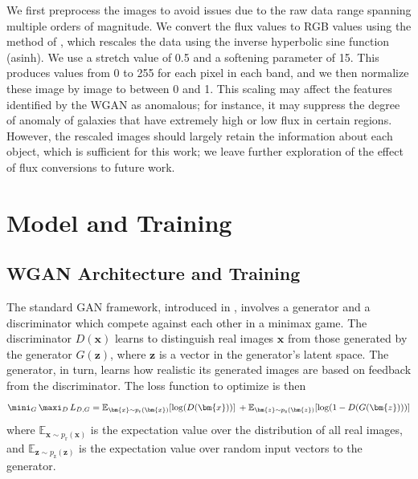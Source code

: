 We first preprocess the images to avoid issues due to the raw data range spanning multiple orders of magnitude.
We convert the flux values to RGB values using the method of \citealt{Lupton2004}, which rescales the data using the inverse hyperbolic sine function (asinh).
We use a stretch value of 0.5 and a softening parameter of 15.
This produces values from 0 to 255 for each pixel in each band, and we then normalize these image by image to between 0 and 1.
This scaling may affect the features identified by the WGAN as anomalous; for instance, it may suppress the degree of anomaly of galaxies that have extremely high or low flux in certain regions.
However, the rescaled images should largely retain the information about each object, which is sufficient for this work; we leave further exploration of the effect of flux conversions to future work.

\section{Model and Training}
\label{sec:model}

\subsection{WGAN Architecture and Training}

The standard GAN framework, introduced in \cite{Goodfellow2014}, involves a generator and a discriminator which compete against each other in a minimax game.
The discriminator $D(\bm{x})$ learns to distinguish real images $\bm{x}$ from those generated by the generator $G(\bm{z})$, where $\bm{z}$ is a vector in the generator's latent space.
The generator, in turn, learns how realistic its generated images are based on feedback from the discriminator.
The loss function to optimize is then
\begin{multline}
\mini_G \, \maxi_D \, L_{D,G} = \mathbb{E}_{\bm{x}\sim p_{\mathrm{r}}(\bm{x})}[\mathrm{log} (D(\bm{x}))] \: + \mathbb{E}_{\bm{z}\sim p_{\mathrm{z}}(\bm{z})}[\mathrm{log}(1 - D(G(\bm{z})))] 
\end{multline}
where $\mathbb{E}_{\bm{x}\sim p_{\mathrm{r}}(\bm{x})}$ is the expectation value over the distribution of all real images, and $\mathbb{E}_{\bm{z}\sim p_{\mathrm{z}}(\bm{z})}$ is the expectation value over random input vectors to the generator.

